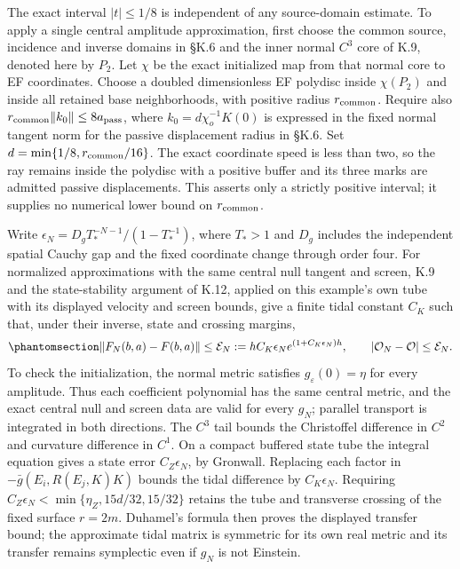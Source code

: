 \documentclass[
  english,
  11pt,
  reqno]{amsart}
\begin{document}
The exact interval \(|t|\le1/8\) is independent of any source-domain
estimate. To apply a single central amplitude approximation, first
choose the common source, incidence and inverse domains in §K.6 and the
inner normal \(C^3\) core of K.9, denoted here by \(P_2\). Let \(\chi\)
be the exact initialized map from that normal core to EF coordinates.
Choose a doubled dimensionless EF polydisc inside \(\chi(P_2)\) and
inside all retained base neighborhoods, with positive radius
\(r_{\rm common}\). Require also
\(r_{\rm common}\|k_0\|\le8a_{\rm pass}\), where
\(k_0=d\chi_o^{-1}K(0)\) is expressed in the fixed normal tangent norm
for the passive displacement radius in §K.6. Set
\(d=\min\{1/8,r_{\rm common}/16\}\). The exact coordinate speed is less
than two, so the ray remains inside the polydisc with a positive buffer
and its three marks are admitted passive displacements. This asserts
only a strictly positive interval; it supplies no numerical lower bound
on \(r_{\rm common}\).

Write \(\epsilon_N=D_gT_*^{-N-1}/(1-T_*^{-1})\), where \(T_*>1\) and
\(D_g\) includes the independent spatial Cauchy gap and the fixed
coordinate change through order four. For normalized approximations with
the same central null tangent and screen, K.9 and the state-stability
argument of K.12, applied on this example's own tube with its displayed
velocity and screen bounds, give a finite tidal constant \(C_K\) such
that, under their inverse, state and crossing margins,
\begin{equation}\protect\phantomsection\label{eq:sch-r1-rational-amplitude-error}{
 \|F_N(b,a)-F(b,a)\|\le
 \mathcal E_N:=hC_K\epsilon_N e^{(1+C_K\epsilon_N)h},\qquad
 |\mathcal O_N-\mathcal O|\le\mathcal E_N.
}\end{equation} To check the initialization, the normal metric satisfies
\(g_\varepsilon(0)=\eta\) for every amplitude. Thus each coefficient
polynomial has the same central metric, and the exact central null and
screen data are valid for every \(g_N\); parallel transport is
integrated in both directions. The \(C^3\) tail bounds the Christoffel
difference in \(C^2\) and curvature difference in \(C^1\). On a compact
buffered state tube the integral equation gives a state error
\(C_Z\epsilon_N\), by Gronwall. Replacing each factor in
\(-\bar g(E_i,R(E_j,K)K)\) bounds the tidal difference by
\(C_K\epsilon_N\). Requiring
\(C_Z\epsilon_N<\min\{\eta_Z,15d/32,15/32\}\) retains the tube and
transverse crossing of the fixed surface \(r=2m\). Duhamel's formula
then proves the displayed transfer bound; the approximate tidal matrix
is symmetric for its own real metric and its transfer remains symplectic
even if \(g_N\) is not Einstein.
\end{document}
